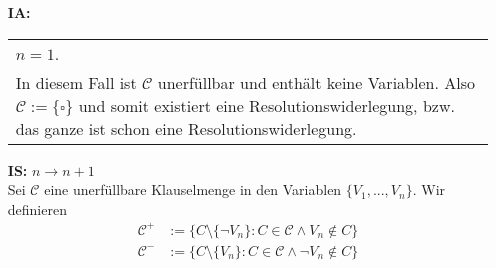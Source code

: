 \documentclass[a4paper,10pt]{article}
\newcommand{\tabspace}{15cm}
\begin{document}
\begin{itemize}
	\item[\textbf{IA:}] 
		\begin{tabular}{@{} p{\tabspace}}
		$n=1$. \\
		In diesem Fall ist $\mathcal{C}$ unerfüllbar und enthält keine Variablen. Also $\mathcal{C} := \{ \square \}$ und somit existiert eine Resolutionswiderlegung, bzw. das ganze ist schon eine Resolutionswiderlegung.
		\end{tabular}
	\item[\textbf{IS:}] $n \rightarrow n+1$ \\
	
		Sei $\mathcal{C}$ eine unerfüllbare Klauselmenge in den Variablen $\{V_1,...,V_n \}$. Wir definieren
		\begin{align*}
			\mathcal{C}^+ &:= \{C \setminus \{ \lnot V_n  \}: C \in \mathcal{C} \land V_n \not \in C \} \\
			\mathcal{C}^- &:= \{C \setminus \{V_n  \}: C \in \mathcal{C} \land \lnot V_n \not \in C \}
		\end{align*}
		

\end{itemize}
\end{document}
